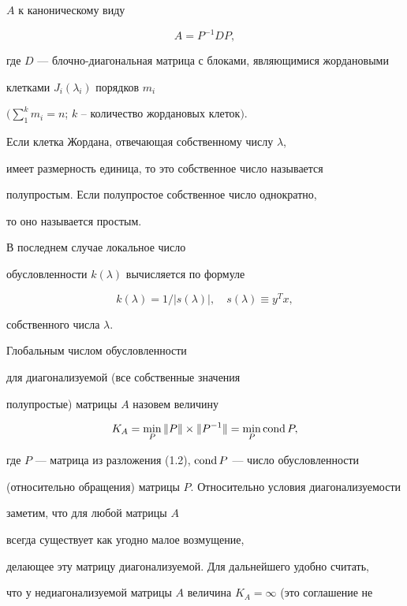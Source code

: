 $A$ к каноническому виду


\begin{equation}


A=P^{-1}DP,


\end{equation}


где $D$ --- блочно-диагональная матрица с блоками, являющимися жордановыми


клетками $J_i(\lambda_i)$ порядков $m_i$


$\Big(\sum\limits_1^k m_i=n$; $k$ -- количество жордановых клеток$\Big)$.


Если клетка Жордана, отвечающая собственному числу $\lambda$,


имеет размерность единица, то это собственное число называется


полупростым. Если полупростое собственное число однократно,


то оно называется простым.


В последнем случае локальное число


обусловленности $k(\lambda)$ вычисляется по формуле


$$


k(\lambda)=1/|s(\lambda)|,\quad s(\lambda)\equiv y^T x,


$$


собственного числа $\lambda$.





Глобальным числом обусловленности 


для диагонализуемой (все собственные значения


полупростые) матрицы $A$ назовем величину


$$


K_A=\min\limits_P \|P\|\times\|P^{-1}\|=\min\limits_P \cond P,


$$


где $P$ --- матрица из разложения (1.2), $\operatorname{cond} P$ --- число обусловленности


(относительно обращения) матрицы $P$. Относительно условия диагонализуемости


заметим, что для любой матрицы $A$


всегда существует как угодно малое возмущение,


делающее эту матрицу диагонализуемой. Для дальнейшего удобно считать,


что у недиагонализуемой матрицы $A$ величина $K_A=\infty$ (это соглашение не


